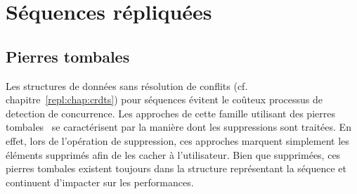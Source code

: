 
\section{Séquences répliquées}

\subsection{Pierres tombales}

Les structures de données sans résolution de conflits
(cf. chapitre~\ref{repl:chap:crdts}) pour séquences évitent le coûteux processus
de detection de concurrence. Les approches de cette famille utilisant des
pierres tombales~\cite{ahmed2011evaluating, conway2014language,
  grishchenko2010deep, oster2006data, preguica2009commutative,
  roh2011replicated, weiss2007wooki, wu2010partial, yu2012stringwise} se
caractérisent par la manière dont les suppressions sont traitées. En effet, lors
de l'opération de suppression, ces approches marquent simplement les éléments
supprimés afin de les cacher à l'utilisateur. Bien que supprimées, ces pierres
tombales existent toujours dans la structure représentant la séquence et
continuent d'impacter sur les performances.

